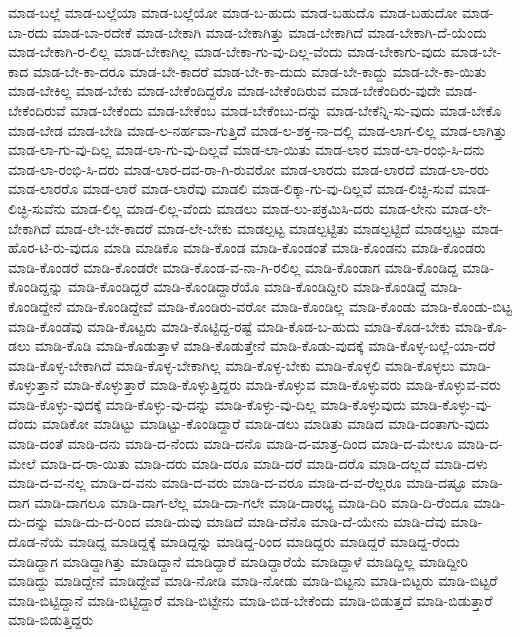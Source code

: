 {ಮಾಡ-ಬಲ್ಲೆ
ಮಾಡ-ಬಲ್ಲೆಯಾ
ಮಾಡ-ಬಲ್ಲೆಯೋ
ಮಾಡ-ಬ-ಹುದು
ಮಾಡ-ಬಹುದೊ
ಮಾಡ-ಬಹುದೋ
ಮಾಡ-ಬಾ-ರದು
ಮಾಡ-ಬಾ-ರದೇಕೆ
ಮಾಡ-ಬೇಕಾಗಿ
ಮಾಡ-ಬೇಕಾಗಿತ್ತು
ಮಾಡ-ಬೇಕಾಗಿದೆ
ಮಾಡ-ಬೇಕಾಗಿ-ದೆ-ಯೆಂದು
ಮಾಡ-ಬೇಕಾಗಿ-ರ-ಲಿಲ್ಲ
ಮಾಡ-ಬೇಕಾಗಿಲ್ಲ
ಮಾಡ-ಬೇಕಾ-ಗು-ವು-ದಿಲ್ಲ-ವೆಂದು
ಮಾಡ-ಬೇಕಾಗು-ವುದು
ಮಾಡ-ಬೇ-ಕಾದ
ಮಾಡ-ಬೇ-ಕಾ-ದರೂ
ಮಾಡ-ಬೇ-ಕಾದರೆ
ಮಾಡ-ಬೇ-ಕಾ-ದುದು
ಮಾಡ-ಬೇ-ಕಾದ್ದು
ಮಾಡ-ಬೇ-ಕಾ-ಯಿತು
ಮಾಡ-ಬೇಕಿಲ್ಲ
ಮಾಡ-ಬೇಕು
ಮಾಡ-ಬೇಕೆಂದಿದ್ದರೊ
ಮಾಡ-ಬೇಕೆಂದಿರುವ
ಮಾಡ-ಬೇಕೆಂದಿರು-ವುದೇ
ಮಾಡ-ಬೇಕೆಂದಿರುವೆ
ಮಾಡ-ಬೇಕೆಂದು
ಮಾಡ-ಬೇಕೆಂಬ
ಮಾಡ-ಬೇಕೆಂಬು-ದನ್ನು
ಮಾಡ-ಬೇಕೆನ್ನಿ-ಸು-ವುದು
ಮಾಡ-ಬೇಕೊ
ಮಾಡ-ಬೇಡ
ಮಾಡ-ಬೇಡಿ
ಮಾಡ-ಲ-ನರ್ಹವಾ-ಗುತ್ತಿದೆ
ಮಾಡ-ಲ-ಶಕ್ತ-ನಾ-ದಲ್ಲಿ
ಮಾಡ-ಲಾಗ-ಲಿಲ್ಲ
ಮಾಡ-ಲಾಗಿತ್ತು
ಮಾಡ-ಲಾ-ಗು-ವು-ದಿಲ್ಲ
ಮಾಡ-ಲಾ-ಗು-ವು-ದಿಲ್ಲವೆ
ಮಾಡ-ಲಾ-ಯಿತು
ಮಾಡ-ಲಾರ
ಮಾಡ-ಲಾ-ರಂಭಿ-ಸಿ-ದನು
ಮಾಡ-ಲಾ-ರಂಭಿ-ಸಿ-ದರು
ಮಾಡ-ಲಾರ-ದವ-ರಾ-ಗಿ-ರುವರೋ
ಮಾಡ-ಲಾರದು
ಮಾಡ-ಲಾರದೆ
ಮಾಡ-ಲಾ-ರರು
ಮಾಡ-ಲಾರರೊ
ಮಾಡ-ಲಾರೆ
ಮಾಡ-ಲಾರೆವು
ಮಾಡಲಿ
ಮಾಡ-ಲಿಕ್ಕಾ-ಗು-ವು-ದಿಲ್ಲವೆ
ಮಾಡ-ಲಿಚ್ಛಿ-ಸುವೆ
ಮಾಡ-ಲಿಚ್ಛಿ-ಸುವೆನು
ಮಾಡ-ಲಿಲ್ಲ
ಮಾಡ-ಲಿಲ್ಲ-ವೆಂದು
ಮಾಡಲು
ಮಾಡ-ಲು-ಪಕ್ರಮಿಸಿ-ದರು
ಮಾಡ-ಲೇನು
ಮಾಡ-ಲೇ-ಬೇಕಾಗಿದೆ
ಮಾಡ-ಲೇ-ಬೇ-ಕಾದರೆ
ಮಾಡ-ಲೇ-ಬೇಕು
ಮಾಡಲ್ಪಟ್ಟ
ಮಾಡಲ್ಪಟ್ಟಿತು
ಮಾಡಲ್ಪಟ್ಟಿದೆ
ಮಾಡಲ್ಪಟ್ಟು
ಮಾಡ-ಹೊರ-ಟಿ-ರು-ವುದೂ
ಮಾಡಿ
ಮಾಡಿಕೊ
ಮಾಡಿ-ಕೊಂಡ
ಮಾಡಿ-ಕೊಂಡಂತೆ
ಮಾಡಿ-ಕೊಂಡನು
ಮಾಡಿ-ಕೊಂಡರು
ಮಾಡಿ-ಕೊಂಡರೆ
ಮಾಡಿ-ಕೊಂಡರೇ
ಮಾಡಿ-ಕೊಂಡ-ವ-ನಾ-ಗಿ-ರಲಿಲ್ಲ
ಮಾಡಿ-ಕೊಂಡಾಗ
ಮಾಡಿ-ಕೊಂಡಿದ್ದ
ಮಾಡಿ-ಕೊಂಡಿದ್ದನ್ನು
ಮಾಡಿ-ಕೊಂಡಿದ್ದರೆ
ಮಾಡಿ-ಕೊಂಡಿದ್ದಾರೆಯೊ
ಮಾಡಿ-ಕೊಂಡಿದ್ದೀರಿ
ಮಾಡಿ-ಕೊಂಡಿದ್ದೆ
ಮಾಡಿ-ಕೊಂಡಿದ್ದೇನೆ
ಮಾಡಿ-ಕೊಂಡಿದ್ದೇವೆ
ಮಾಡಿ-ಕೊಂಡಿರು-ವರೋ
ಮಾಡಿ-ಕೊಂಡಿಲ್ಲ
ಮಾಡಿ-ಕೊಂಡು
ಮಾಡಿ-ಕೊಂಡು-ಬಿಟ್ಟ
ಮಾಡಿ-ಕೊಂಡೆವು
ಮಾಡಿ-ಕೊಟ್ಟರು
ಮಾಡಿ-ಕೊಟ್ಟಿದ್ದ-ರಷ್ಟೆ
ಮಾಡಿ-ಕೊಡ-ಬ-ಹುದು
ಮಾಡಿ-ಕೊಡ-ಬೇಕು
ಮಾಡಿ-ಕೊ-ಡಲು
ಮಾಡಿ-ಕೊಡಿ
ಮಾಡಿ-ಕೊಡುತ್ತಾಳೆ
ಮಾಡಿ-ಕೊಡುತ್ತೇನೆ
ಮಾಡಿ-ಕೊಡು-ವುದಕ್ಕೆ
ಮಾಡಿ-ಕೊಳ್ಳ-ಬಲ್ಲೆ-ಯಾ-ದರೆ
ಮಾಡಿ-ಕೊಳ್ಳ-ಬೇಕಾಗಿದೆ
ಮಾಡಿ-ಕೊಳ್ಳ-ಬೇಕಾಗಿಲ್ಲ
ಮಾಡಿ-ಕೊಳ್ಳ-ಬೇಕು
ಮಾಡಿ-ಕೊಳ್ಳಲಿ
ಮಾಡಿ-ಕೊಳ್ಳಲು
ಮಾಡಿ-ಕೊಳ್ಳುತ್ತಾನೆ
ಮಾಡಿ-ಕೊಳ್ಳುತ್ತಾರೆ
ಮಾಡಿ-ಕೊಳ್ಳುತ್ತಿದ್ದರು
ಮಾಡಿ-ಕೊಳ್ಳುವ
ಮಾಡಿ-ಕೊಳ್ಳುವರು
ಮಾಡಿ-ಕೊಳ್ಳುವ-ವರು
ಮಾಡಿ-ಕೊಳ್ಳು-ವುದಕ್ಕೆ
ಮಾಡಿ-ಕೊಳ್ಳು-ವು-ದನ್ನು
ಮಾಡಿ-ಕೊಳ್ಳು-ವು-ದಿಲ್ಲ
ಮಾಡಿ-ಕೊಳ್ಳುವುದು
ಮಾಡಿ-ಕೊಳ್ಳು-ವು-ದೆಂದು
ಮಾಡಿಕೋ
ಮಾಡಿಟ್ಟು
ಮಾಡಿಟ್ಟು-ಕೊಂಡಿದ್ದಾರೆ
ಮಾಡಿ-ಡಲು
ಮಾಡಿತು
ಮಾಡಿದ
ಮಾಡಿ-ದಂತಾಗು-ವುದು
ಮಾಡಿ-ದಂತೆ
ಮಾಡಿ-ದನು
ಮಾಡಿ-ದ-ನೆಂದು
ಮಾಡಿ-ದನೊ
ಮಾಡಿ-ದ-ಮಾತ್ರ-ದಿಂದ
ಮಾಡಿ-ದ-ಮೇಲೂ
ಮಾಡಿ-ದ-ಮೇಲೆ
ಮಾಡಿ-ದ-ರಾ-ಯಿತು
ಮಾಡಿ-ದರು
ಮಾಡಿ-ದರೂ
ಮಾಡಿ-ದರೆ
ಮಾಡಿ-ದರೊ
ಮಾಡಿ-ದಲ್ಲದೆ
ಮಾಡಿ-ದಳು
ಮಾಡಿ-ದ-ವ-ನಲ್ಲ
ಮಾಡಿ-ದ-ವನು
ಮಾಡಿ-ದ-ವರು
ಮಾಡಿ-ದ-ವರೂ
ಮಾಡಿ-ದ-ವ-ರೆಲ್ಲರೂ
ಮಾಡಿ-ದಷ್ಟೂ
ಮಾಡಿ-ದಾಗ
ಮಾಡಿ-ದಾಗಲೂ
ಮಾಡಿ-ದಾಗ-ಲೆಲ್ಲ
ಮಾಡಿ-ದಾ-ಗಲೇ
ಮಾಡಿ-ದಾರಭ್ಯ
ಮಾಡಿ-ದಿರಿ
ಮಾಡಿ-ದಿ-ರೆಂದೂ
ಮಾಡಿ-ದು-ದನ್ನು
ಮಾಡಿ-ದು-ದ-ರಿಂದ
ಮಾಡಿ-ದುವು
ಮಾಡಿದೆ
ಮಾಡಿ-ದೆನೊ
ಮಾಡಿ-ದೆ-ಯೇನು
ಮಾಡಿ-ದೆವು
ಮಾಡಿ-ದೊಡ-ನೆಯೆ
ಮಾಡಿದ್ದ
ಮಾಡಿದ್ದಕ್ಕೆ
ಮಾಡಿದ್ದನ್ನು
ಮಾಡಿದ್ದ-ರಿಂದ
ಮಾಡಿದ್ದರು
ಮಾಡಿದ್ದರೆ
ಮಾಡಿದ್ದ-ರೆಂದು
ಮಾಡಿದ್ದಾಗ
ಮಾಡಿದ್ದಾಗಿತ್ತು
ಮಾಡಿದ್ದಾನೆ
ಮಾಡಿದ್ದಾರೆ
ಮಾಡಿದ್ದಾರೆಯೆ
ಮಾಡಿದ್ದಾಳೆ
ಮಾಡಿದ್ದಿಲ್ಲ
ಮಾಡಿದ್ದೀರಿ
ಮಾಡಿದ್ದು
ಮಾಡಿದ್ದೇನೆ
ಮಾಡಿದ್ದೇವೆ
ಮಾಡಿ-ನೋಡಿ
ಮಾಡಿ-ನೋಡು
ಮಾಡಿ-ಬಿಟ್ಟನು
ಮಾಡಿ-ಬಿಟ್ಟರು
ಮಾಡಿ-ಬಿಟ್ಟರೆ
ಮಾಡಿ-ಬಿಟ್ಟಿದ್ದಾನೆ
ಮಾಡಿ-ಬಿಟ್ಟಿದ್ದಾರೆ
ಮಾಡಿ-ಬಿಟ್ಟೇನು
ಮಾಡಿ-ಬಿಡ-ಬೇಕೆಂದು
ಮಾಡಿ-ಬಿಡುತ್ತದೆ
ಮಾಡಿ-ಬಿಡುತ್ತಾರೆ
ಮಾಡಿ-ಬಿಡುತ್ತಿದ್ದರು
}
